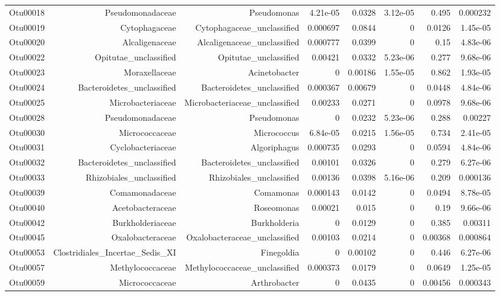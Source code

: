 \begin{table}[ht]
\begin{tabular}{crrrrrrr}
  Otu00018 & Pseudomonadaceae & Pseudomonas & 4.21e-05 & 0.0328 & 3.12e-05 & 0.495 & 0.000232 \\ 
  Otu00019 & Cytophagaceae & Cytophagaceae\_unclassified & 0.000697 & 0.0844 & 0 & 0.0126 & 1.45e-05 \\ 
  Otu00020 & Alcaligenaceae & Alcaligenaceae\_unclassified & 0.000777 & 0.0399 & 0 & 0.15 & 4.83e-06 \\ 
  Otu00022 & Opitutae\_unclassified & Opitutae\_unclassified & 0.00421 & 0.0332 & 5.23e-06 & 0.277 & 9.68e-06 \\ 
  Otu00023 & Moraxellaceae & Acinetobacter & 0 & 0.00186 & 1.55e-05 & 0.862 & 1.93e-05 \\ 
  Otu00024 & Bacteroidetes\_unclassified & Bacteroidetes\_unclassified & 0.000367 & 0.00679 & 0 & 0.0448 & 4.84e-06 \\ 
  Otu00025 & Microbacteriaceae & Microbacteriaceae\_unclassified & 0.00233 & 0.0271 & 0 & 0.0978 & 9.68e-06 \\ 
  Otu00028 & Pseudomonadaceae & Pseudomonas & 0 & 0.0232 & 5.23e-06 & 0.288 & 0.00227 \\ 
  Otu00030 & Micrococcaceae & Micrococcus & 6.84e-05 & 0.0215 & 1.56e-05 & 0.734 & 2.41e-05 \\ 
  Otu00031 & Cyclobacteriaceae & Algoriphagus & 0.000735 & 0.0293 & 0 & 0.0594 & 4.84e-06 \\ 
  Otu00032 & Bacteroidetes\_unclassified & Bacteroidetes\_unclassified & 0.00101 & 0.0326 & 0 & 0.279 & 6.27e-06 \\ 
  Otu00033 & Rhizobiales\_unclassified & Rhizobiales\_unclassified & 0.00136 & 0.0398 & 5.16e-06 & 0.209 & 0.000136 \\ 
  Otu00039 & Comamonadaceae & Comamonas & 0.000143 & 0.0142 & 0 & 0.0494 & 8.78e-05 \\ 
  Otu00040 & Acetobacteraceae & Roseomonas & 0.00021 & 0.015 & 0 & 0.19 & 9.66e-06 \\ 
  Otu00042 & Burkholderiaceae & Burkholderia & 0 & 0.0129 & 0 & 0.385 & 0.00311 \\ 
  Otu00045 & Oxalobacteraceae & Oxalobacteraceae\_unclassified & 0.00103 & 0.0214 & 0 & 0.00368 & 0.000864 \\ 
  Otu00053 & Clostridiales\_Incertae\_Sedis\_XI & Finegoldia & 0 & 0.00102 & 0 & 0.446 & 6.27e-06 \\ 
  Otu00057 & Methylococcaceae & Methylococcaceae\_unclassified & 0.000373 & 0.0179 & 0 & 0.0649 & 1.25e-05 \\ 
  Otu00059 & Micrococcaceae & Arthrobacter & 0 & 0.0435 & 0 & 0.00456 & 0.000343 \\ 

\end{tabular}
\end{table}
